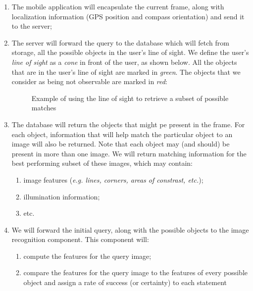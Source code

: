 \documentclass[a4paper,onecolumn,oneside,titlepage,11pt]{report}
\begin{document}
\begin{enumerate}
	\item The mobile application will encapsulate the current frame, along with localization information (GPS position and compass orientation) and send it to the server;
	\item The server will forward the query to the database which will fetch from storage, all the possible objects in the user's line of sight. We define the user's \emph{line of sight} as a \emph{cone} in front of the user, as shown below. All the objects that are in the user's line of sight are marked in \emph{green}. The objects that we consider as being not observable are marked in \emph{red}:

\begin{figure}[H]
\begin{center}
\end{center}
\caption{Example of using the line of sight to retrieve a subset of possible matches}
\end{figure}
	
	\item The database will return the objects that might pe present in the frame. For each object, information that will help match the particular object to an image will also be returned. Note that each object may (and should) be present in more than one image. We will return matching information for the best performing subset of these images, which may contain:
	\begin{enumerate}
		\item image features (\emph{e.g. lines, corners, areas of constrast, etc.});
		\item illumination information;
		\item etc.
	\end{enumerate}
	\item We will forward the initial query, along with the possible objects to the image recognition component. This component will:
		\begin{enumerate}
			\item compute the features for the query image;
			\item compare the features for the query image to the features of every possible object and assign a rate of success (or certainty) to each statement
			

\end{enumerate}
\end{enumerate}
\end{document}
